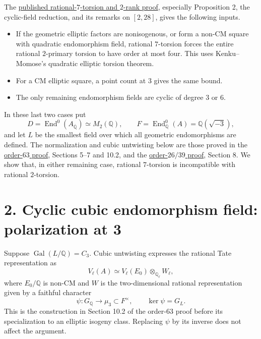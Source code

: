 \documentclass[
  11pt,
]{article}
\providecommand{\tightlist}{%
  \setlength{\itemsep}{0pt}\setlength{\parskip}{0pt}}
\begin{document}
The
\href{https://genus-2-torsion.github.io/proofs/qsimple-2214-obstruction.html}{published
rational-\(7\)-torsion and \(2\)-rank proof}, especially Proposition 2,
the cyclic-field reduction, and its remarks on \([2,28]\), gives the
following inputs.

\begin{itemize}
\tightlist
\item
  If the geometric elliptic factors are nonisogenous, or form a non-CM
  square with quadratic endomorphism field, rational \(7\)-torsion
  forces the entire rational \(2\)-primary torsion to have order at most
  four. This uses Kenku--Momose's quadratic elliptic torsion theorem.
\item
  For a CM elliptic square, a point count at \(3\) gives the same bound.
\item
  The only remaining endomorphism fields are cyclic of degree \(3\) or
  \(6\).
\end{itemize}

In these last two cases put \[
D=\operatorname{End}^0(A_{\overline{\mathbb Q}})\simeq M_2(\mathbb Q),
\qquad F=\operatorname{End}^0_{\mathbb Q}(A)=\mathbb Q(\sqrt{-3}),
\] and let \(L\) be the smallest field over which all geometric
endomorphisms are defined. The normalization and cubic untwisting below
are those proved in the
\href{https://genus-2-torsion.github.io/proofs/qsimple-63-obstruction.html}{order-\(63\)
proof}, Sections 5--7 and 10.2, and the
\href{https://genus-2-torsion.github.io/proofs/geometric-26-39-obstruction.html}{order-\(26/39\)
proof}, Section 8. We show that, in either remaining case, rational
\(7\)-torsion is incompatible with rational \(2\)-torsion.

\section{2. Cyclic cubic endomorphism field: polarization at
3}\label{cyclic-cubic-endomorphism-field-polarization-at-3}

Suppose \(\operatorname{Gal}(L/\mathbb Q)=C_3\). Cubic untwisting
expresses the rational Tate representation as \[
V_\ell(A)\simeq V_\ell(E_0)\otimes_{\mathbb Q_\ell}W_\ell,
\] where \(E_0/\mathbb Q\) is non-CM and \(W\) is the two-dimensional
rational representation given by a faithful character \[
\psi:G_{\mathbb Q}\longrightarrow\mu_3\subset F^\times,
\qquad \ker\psi=G_L.
\] This is the construction in Section 10.2 of the order-\(63\) proof
before its specialization to an elliptic isogeny class. Replacing
\(\psi\) by its inverse does not affect the argument.
\end{document}
